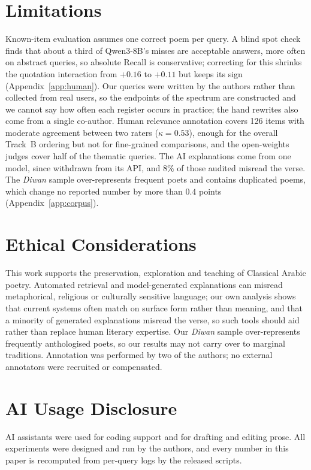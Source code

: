 \documentclass[11pt]{article}
\begin{document}
\section*{Limitations}

Known-item evaluation assumes one correct poem per query. A blind spot check finds that about a third of Qwen3-8B's misses are acceptable answers, more often on abstract queries, so absolute Recall is conservative; correcting for this shrinks the quotation interaction from $+0.16$ to $+0.11$ but keeps its sign (Appendix~\ref{app:human}). Our queries were written by the authors rather than collected from real users, so the endpoints of the spectrum are constructed and we cannot say how often each register occurs in practice; the hand rewrites also come from a single co-author. Human relevance annotation covers 126 items with moderate agreement between two raters ($\kappa{=}0.53$), enough for the overall Track~B ordering but not for fine-grained comparisons, and the open-weights judges cover half of the thematic queries. The AI explanations come from one model, since withdrawn from its API, and $8\%$ of those audited misread the verse. The \textit{Diwan} sample over-represents frequent poets and contains duplicated poems, which change no reported number by more than $0.4$ points (Appendix~\ref{app:corpus}).

\section*{Ethical Considerations}

This work supports the preservation, exploration and teaching of Classical Arabic poetry. Automated retrieval and model-generated explanations can misread metaphorical, religious or culturally sensitive language; our own analysis shows that current systems often match on surface form rather than meaning, and that a minority of generated explanations misread the verse, so such tools should aid rather than replace human literary expertise. Our \textit{Diwan} sample over-represents frequently anthologised poets, so our results may not carry over to marginal traditions. Annotation was performed by two of the authors; no external annotators were recruited or compensated.

\section*{AI Usage Disclosure}

AI assistants were used for coding support and for drafting and editing prose. All experiments were designed and run by the authors, and every number in this paper is recomputed from per-query logs by the released scripts.
\end{document}
